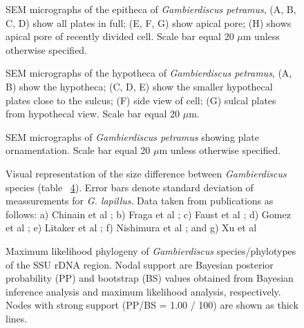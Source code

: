 \documentclass[12pt]{article}
\begin{document}
\FloatBarrier 
\begin{figure} 
\caption{SEM micrographs of the epitheca of \emph{Gambierdiscus petramus}, (A, B, C, D) show all plates in full; (E, F, G) show apical pore; (H) shows apical pore of recently divided cell. Scale bar equal 20 $\mu$m unless otherwise specified.} 
\label{fig:epiSEM}
\end{figure} 
\FloatBarrier 

\FloatBarrier 
\begin{figure} 
\caption{SEM micrographs of the hypotheca of \emph{Gambierdiscus petramus}, (A, B) show the hypotheca; (C, D, E) show the smaller hypothecal plates close to the sulcus; (F) side view of cell; (G) sulcal plates from hypothecal view. Scale bar equal 20 $\mu$m.} 
\label{fig:hypoSEM}
\end{figure} 
\FloatBarrier

\FloatBarrier 
\begin{figure} 
\caption{SEM micrographs of \emph{Gambierdiscus petramus} showing plate ornamentation. Scale bar equal 20 $\mu$m unless otherwise specified.} 
\label{fig:ornSEM}
\end{figure} 
\FloatBarrier

\FloatBarrier 
\begin{figure} 
\caption{Visual representation of the size difference between \emph{Gambierdiscus} species (table ~\ref{fig:SizeGraph}). Error bars denote standard deviation of meassurements for \emph{G. lapillus}. Data taken from publications as follows: a) Chinain et al \citep{chinain1999morphology}; b) Fraga et al \citep{fraga2014genus}; c) Faust et al \citep{faust1995observation}; d) Gomez et al \citep{gomez2015fukuyoa}; e) Litaker et al \citep{litaker2009taxonomy}; f) Nishimura et al \citep{nishimura2014morphology}; and g) Xu et al \citep{xu2014distribution}} 
\label{fig:SizeGraph}
\end{figure} 


\FloatBarrier 
\begin{figure} 
\caption{Maximum likelihood phylogeny of \textit{Gambierdiscus} species/phylotypes of the SSU rDNA region. Nodal support are Bayesian posterior probability (PP) and bootstrap (BS) values obtained from Bayesian inference analysis and maximum likelihood analysis, respectively. Nodes with strong support (PP/BS = 1.00 / 100) are shown as thick lines.}
\label{fig:HGSSU} 
\end{figure} 
\FloatBarrier 
\end{document}
